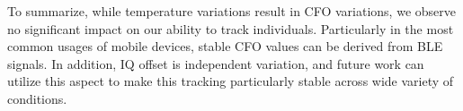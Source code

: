 To summarize, while temperature variations result in CFO variations, we observe no significant impact on our ability to track individuals. Particularly in the most common usages of mobile devices, stable CFO values can be derived from BLE signals. In addition, IQ offset is independent variation, and future work can utilize this aspect to make this tracking particularly stable across wide variety of conditions.


